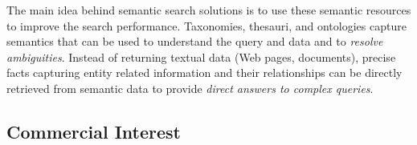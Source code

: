
The main idea behind semantic search solutions is to use these semantic resources to improve the search performance. Taxonomies, thesauri, and ontologies capture semantics that can be used to understand the query and data and to \emph{resolve ambiguities}. Instead of returning textual data (Web pages, documents), precise facts capturing entity related information and their relationships can be directly retrieved from semantic data to provide \emph{direct answers to complex queries}. 

\subsection{Commercial Interest}

